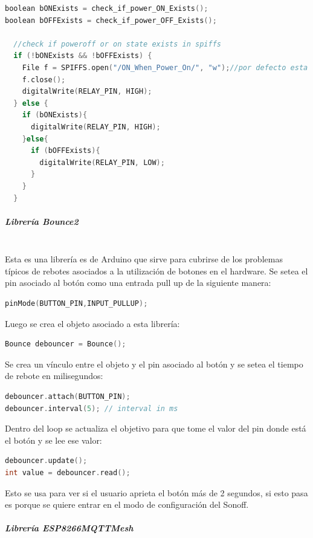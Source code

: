 \begin{lstlisting}[language=C]
boolean bONExists = check_if_power_ON_Exists();
boolean bOFFExists = check_if_power_OFF_Exists();

  //check if poweroff or on state exists in spiffs
  if (!bONExists && !bOFFExists) {
    File f = SPIFFS.open("/ON_When_Power_On/", "w");//por defecto esta ON
    f.close();
    digitalWrite(RELAY_PIN, HIGH);
  } else {
    if (bONExists){
      digitalWrite(RELAY_PIN, HIGH);
    }else{
      if (bOFFExists){
        digitalWrite(RELAY_PIN, LOW);
      }
    }
  }
\end{lstlisting}

\subparagraph{Librería Bounce2}\mbox{}\\
Esta es una librería es de Arduino que sirve para cubrirse de los problemas típicos de rebotes asociados a la utilización de botones en el hardware. Se setea el pin asociado al botón como una entrada pull up de la siguiente manera:

\begin{lstlisting}[language=C]
pinMode(BUTTON_PIN,INPUT_PULLUP);
\end{lstlisting}

Luego se crea el objeto asociado a esta librería:

\begin{lstlisting}[language=C]
Bounce debouncer = Bounce();
\end{lstlisting}

Se crea un vínculo entre el objeto y el pin asociado al botón y se setea el tiempo de rebote en milisegundos:

\begin{lstlisting}[language=C]
debouncer.attach(BUTTON_PIN);
debouncer.interval(5); // interval in ms
\end{lstlisting}

Dentro del loop se actualiza el objetivo para que tome el valor del pin donde está el botón y  se lee ese valor:

\begin{lstlisting}[language=C]
debouncer.update();
int value = debouncer.read();
\end{lstlisting}

Esto se usa para ver si el usuario aprieta el botón más de 2 segundos, si esto pasa es porque se quiere entrar en el modo de configuración del Sonoff.

\subparagraph{Librería ESP8266MQTTMesh}\mbox{}\\

